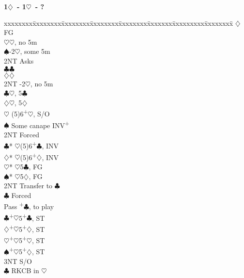 \documentclass[10pt]{article}
\renewcommand{\c}{$\clubsuit$}
\renewcommand{\d}{$\diamondsuit$}
\newcommand{\h}{$\heartsuit$}
\newcommand{\s}{$\spadesuit$}
\newcommand{\p}{\textsuperscript{+}}
\newenvironment{bidtable}[1][]
{\textbf{#1}
  \begin{adjustwidth}{1em}{}
    \addvspace{2pt}
    \begin{tabbing}
      xxxxxxxx\=xxxxxxxx\=xxxxxxxx\=xxxxxxxx\=xxxxxxxx\=xxxxxxx\=xxxxxxxxx\=xxxxxxxx\=\kill}
{\end{tabbing}\end{adjustwidth}\bigskip}%
\begin{document}
\begin{bidtable}[1\d\ - 1\h\ - ?]
     \d  \> FG                                              \\
     \>      \h {}\h, no 5m                               \\
     \>      \s {}-2\h, some 5m                           \\
     \>      \>     \> 2NT  \> Asks                             \\
     \>      \>     \>      \c   {}\c                     \\
     \>      \>     \>      \d   {}\d                     \\
     \>      \> 2NT -2\h, no 5m                             \\
     \>      \c {}\h, 5\c                                 \\
     \>      \d {}\h, 5\d                                 \\
     \h  \> (5)6\p\h, S/O                                   \\
     \s  \> Some canape INV\p                               \\
     \>      \> 2NT \> Forced                                   \\
     \>      \>     \c* {}\h (5)6\p\c, INV                \\
     \>      \>     \d* {}\h (5)6\p\d, INV                \\
     \>      \>     \h* {}\h 5\c, FG                      \\
     \>      \>     \s* {}\h 5\d, FG                      \\
     \> 2NT  \> Transfer to \c                                  \\
     \>      \c \> Forced                                   \\
     \>      \>     \> Pass \p\c, to play                   \\
     \c  {}\p\h 5\p\c, ST                                 \\
     \d  {}\p\h 5\p\d, ST                                 \\
     \h  {}\p\h 5\p\h, ST                                 \\
     \s  {}\p\h 5\p\d, ST                                 \\
     \> 3NT  \> S/O                                             \\
     \c  \> RKCB in \h                                      \\

\end{bidtable}
\end{document}
